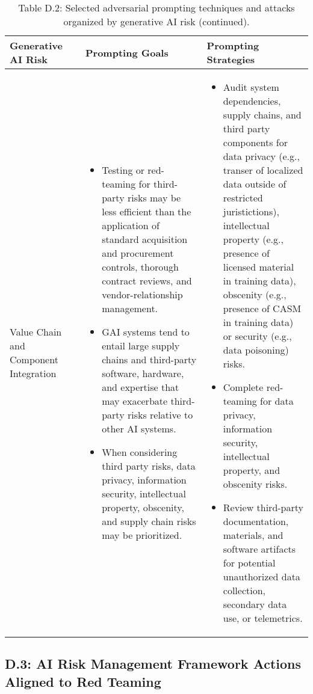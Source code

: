 \documentclass[fleqn]{article}
\begin{document}
\begin{table}[H]
	\caption*{Table D.2: Selected adversarial prompting techniques and attacks organized by generative AI risk (continued).}
	\label{tab:rt_by_gai_risk_cont4}
	\scriptsize
	\begin{tabular}{|m{0.25\linewidth} |m{0.40\linewidth} | m{0.35\linewidth} |}		
		\hline
		\textbf{Generative AI Risk} &  \textbf{Prompting Goals} & \textbf{Prompting Strategies} \\
		\hline			
		Value Chain and Component Integration &
		\begin{itemize}[noitemsep, leftmargin=*] 
			\item Testing or red-teaming for third-party risks may be less efficient than the application of standard acquisition and procurement controls, thorough contract reviews, and vendor-relationship management.
			\item GAI systems tend to entail large supply chains and third-party software, hardware, and expertise that may exacerbate third-party risks relative to other AI systems. 
			\item When considering third party risks, data privacy, information security, intellectual property, obscenity, and supply chain risks may be prioritized.
		\end{itemize} 
		& 
		\begin{itemize}[noitemsep, leftmargin=*] 
			\item Audit system dependencies, supply chains, and third party components for data privacy (e.g., transer of localized data outside of restricted juristictions), intellectual property (e.g., presence of licensed material in training data), obscenity (e.g., presence of CASM in training data) or security (e.g., data poisoning) risks.
			\item Complete red-teaming for data privacy, information security, intellectual property, and obscenity risks.
			\item Review third-party documentation, materials, and software artifacts for potential unauthorized data collection, secondary data use, or telemetrics.
		\end{itemize} \\
		\hline
	\end{tabular}
\end{table}

\subsection*{D.3: AI Risk Management Framework Actions Aligned to Red Teaming}\label{sec:appndxd3}
\end{document}
